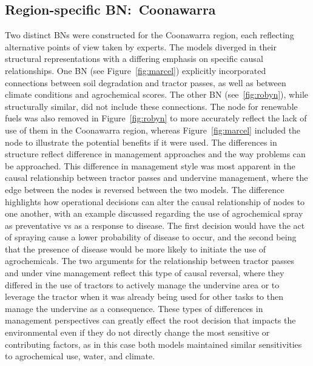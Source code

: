 \documentclass[fleqn,10pt]{wlscirep}
\begin{document}

\subsection{Region-specific BN:~Coonawarra}

Two distinct BNs were constructed for the Coonawarra region, each reflecting alternative points of view taken by experts. The models diverged in their structural representations with a differing emphasis on specific causal relationships. One BN (see Figure~\ref{fig:marcel}) explicitly incorporated connections between soil degradation and tractor passes, as well as between climate conditions and agrochemical scores. The other BN (see~\ref{fig:robyn}), while structurally similar, did not include these connections. The node for renewable fuels was also removed in Figure~\ref{fig:robyn} to more accurately reflect the lack of use of them in the Coonawarra region, whereas Figure~\ref{fig:marcel} included the node to illustrate the potential benefits if it were used. The differences in structure reflect difference in management approaches and the way problems can be approached. This difference in management style was most apparent in the causal relationship between tractor passes and undervine management, where the edge between the nodes is reversed between the two models. The difference highlights how operational decisions can alter the causal relationship of nodes to one another, with an example discussed regarding the use of agrochemical spray as preventative vs as a response to disease. The first decision would have the act of spraying cause a lower probability of disease to occur, and the second being that the presence of disease would be more likely to initiate the use of agrochemicals. The two arguments for the relationship between tractor passes and under vine management reflect this type of causal reversal, where they differed in the use of tractors to actively manage the undervine area or to leverage the tractor when it was already being used for other tasks to then manage the undervine as a consequence. These types of differences in management perspectives can greatly effect the root decision that impacts the environmental even if they do not directly change the most sensitive or contributing factors, as in this case both models maintained similar sensitivities to agrochemical use, water, and climate.
\end{document}
